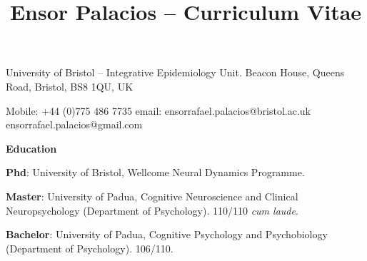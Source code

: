 \documentclass[11pt,usenames, dvipsnames]{article}
\title{\bfseries Ensor Palacios -- Curriculum Vitae}
\begin{document}
\date{\vspace{5ex}}   %
\maketitle
\vspace{-70pt}
\medskip

University of Bristol -- Integrative Epidemiology Unit.\newline
Beacon House, Queens Road, Bristol, BS8 1QU, UK\newline

Mobile: +44 (0)775 486 7735\newline
email: ensorrafael.palacios@bristol.ac.uk\newline 
       ensorrafael.palacios@gmail.com\newline


\vspace{.35cm}

{\large \bfseries \color{color_64493} Education}\newline
\vspace{1pt}

 {\bfseries Phd}: University of Bristol, Wellcome Neural Dynamics Programme.\newline 
\vspace{-5pt}

 {\bfseries Master}: University of Padua, Cognitive Neuroscience and Clinical Neuropsychology (Department of Psychology). 110/110 \emph{cum laude}.\newline
\vspace{-5pt}

 {\bfseries Bachelor}: University of Padua, Cognitive Psychology and Psychobiology (Department of Psychology). 106/110.\newline
\vspace{-5pt}

\end{document}
